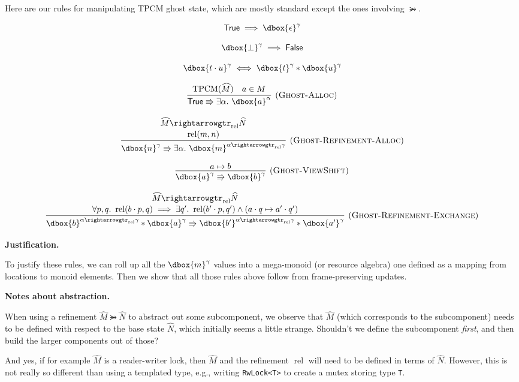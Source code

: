 \documentclass{article}
\newcommand{\einfer}[3]
        {\infer[(\textsc{#1})]{#3}{#2}}
\newcommand{\stacktwo}[2]{\stackanchor{\ensuremath{#1}}{\ensuremath{#2}}}
\newcommand\dboxed[1]{\dbox{\vphantom{t}\ensuremath{#1}}}
\newcommand{\viewshift}{\Rrightarrow}
\newcommand{\unit}{\epsilon}
\newcommand{\true}{\textsf{True}}
\newcommand{\false}{\textsf{False}}
\DeclareMathOperator{\rel}{rel}
\DeclareMathOperator{\TPCM}{TPCM}
\newcommand{\refines}{\rightarrowgtr}
\begin{document}
Here are our rules for manipulating TPCM ghost state, which are mostly standard except
the ones involving $\refines$.

\[
  \true \implies \dboxed{\unit}^\gamma
\]

\[
  \dboxed{\bot}^\gamma \implies \false
\]

\[
  \dboxed{t\cdot u}^\gamma\iff\dboxed{t}^\gamma * \dboxed{u}^\gamma
\]

\[
  \einfer{Ghost-Alloc}{
    \TPCM(\widehat{M}) \quad a\in M
  }{
    \true \viewshift \exists\alpha.~ \dboxed{a}^\alpha
  }
\]

\[
  \einfer{Ghost-Refinement-Alloc}{
    \stacktwo{
      \widehat{M} \refines_{\rel} \widehat{N}
    }{
      \rel(m, n)
    }
  }{
    \dboxed{n}^\gamma \viewshift \exists \alpha.~ \dboxed{m}^{\alpha \refines_{\rel} \gamma}
  }
\]

\[
  \einfer{Ghost-ViewShift}{
    a \mapsto b
  }{
    \dboxed{a}^\gamma \viewshift \dboxed{b}^\gamma
  }
\]

\[
  \einfer{Ghost-Refinement-Exchange}{
    \stacktwo{
      \widehat{M} \refines_{\rel} \widehat{N}
    }{
      \forall p,q.~ \rel(b\cdot p, q) \implies \exists q' .~ \rel(b' \cdot p, q') \land (a \cdot q \mapsto a' \cdot q')
    }
  }{
    \dboxed{b}^{\alpha \refines_{\rel} \gamma} * \dboxed{a}^\gamma
      \viewshift
    \dboxed{b'}^{\alpha \refines_{\rel} \gamma} * \dboxed{a'}^\gamma
  }
\]

\textbf{Justification.}

To justify these rules, we can roll up all the $\dboxed{m}^\gamma$ values into a mega-monoid (or resource algebra)
one defined as a mapping from locations to monoid elements.
Then we show that all those rules above follow from frame-preserving updates.

\textbf{Notes about abstraction.}

When using a refinement
$\widehat{M} \refines \widehat{N}$
to abstract out some subcomponent, we observe that $\widehat{M}$ (which corresponds to the subcomponent) needs to be defined with respect to the base state $\widehat{N}$,
which initially seems a little strange. Shouldn't we define the subcomponent \emph{first}, and then build the larger components out of those?

And yes, if for example $\widehat{M}$ is a reader-writer lock, then $\widehat{M}$ and the refinement $\rel$ will need to be defined in terms of $\widehat{N}$. However, this is not really so different than using a templated type, e.g., writing \texttt{RwLock<T>} to create a mutex storing type \texttt{T}.
\end{document}
